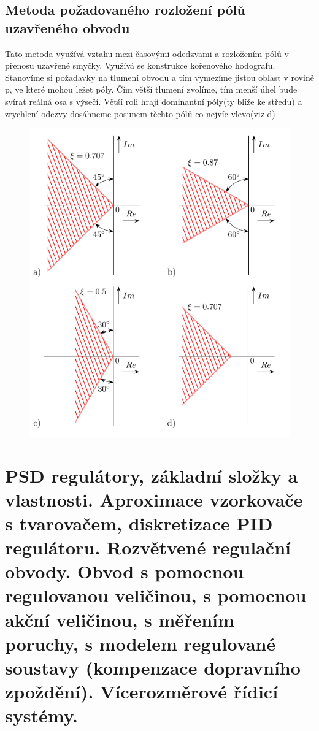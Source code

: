 \subsection*{Metoda požadovaného rozložení pólů uzavřeného obvodu}
Tato metoda využívá vztahu mezi časovými odedzvami a rozložením pólů v přenosu uzavřené smyčky. Využívá se konstrukce kořenového hodografu.\\
Stanovíme si požadavky na tlumení obvodu a tím vymezíme jistou oblast v rovině p, ve které mohou ležet póly.
Čím větší tlumení zvolíme, tím menší úhel bude svírat reálná osa s výsečí. Větší roli hrají dominantní póly(ty blíže ke středu) a zrychlení odezvy dosáhneme posunem těchto pólů co nejvíc vlevo(viz d)\\
\begin{figure}[H]
    \includegraphics*[scale = 1]{images/metodaRozlozeniPolu.png}
\end{figure}


\newpage


\section{PSD regulátory, základní složky a vlastnosti. Aproximace vzorkovače s tvarovačem, diskretizace PID regulátoru.
  Rozvětvené regulační obvody. Obvod s pomocnou regulovanou veličinou, s pomocnou akční veličinou, s měřením
  poruchy, s modelem regulované soustavy (kompenzace dopravního zpoždění). Vícerozměrové řídicí systémy.}

